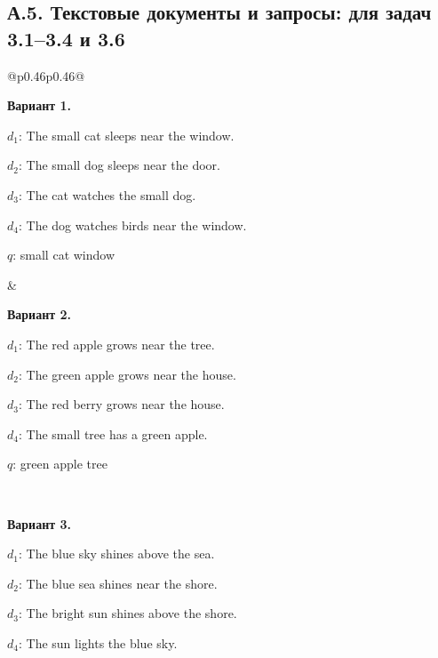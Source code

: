 \documentclass[12pt,a4paper]{article}
\begin{document}
\par\ifdim\dimexpr\pagegoal-\pagetotal\relax<140pt\relax\newpage\fi
\subsection*{А.5. Текстовые документы и запросы: для задач 3.1--3.4 и 3.6}
{\small
\begin{longtable}{@{}p{0.46\textwidth}p{0.46\textwidth}@{}}
\begin{minipage}[t]{\linewidth}\vspace{0pt}\raggedright\setlength{\parskip}{0pt}
\textbf{Вариант 1.}\par\smallskip
$d_1$: The small cat sleeps near the window.\par\smallskip
$d_2$: The small dog sleeps near the door.\par\smallskip
$d_3$: The cat watches the small dog.\par\smallskip
$d_4$: The dog watches birds near the window.\par\smallskip
$q$: small cat window\par
\end{minipage} &
\begin{minipage}[t]{\linewidth}\vspace{0pt}\raggedright\setlength{\parskip}{0pt}
\textbf{Вариант 2.}\par\smallskip
$d_1$: The red apple grows near the tree.\par\smallskip
$d_2$: The green apple grows near the house.\par\smallskip
$d_3$: The red berry grows near the house.\par\smallskip
$d_4$: The small tree has a green apple.\par\smallskip
$q$: green apple tree\par
\end{minipage}\\\noalign{\vskip 14pt}
\begin{minipage}[t]{\linewidth}\vspace{0pt}\raggedright\setlength{\parskip}{0pt}
\textbf{Вариант 3.}\par\smallskip
$d_1$: The blue sky shines above the sea.\par\smallskip
$d_2$: The blue sea shines near the shore.\par\smallskip
$d_3$: The bright sun shines above the shore.\par\smallskip
$d_4$: The sun lights the blue sky.\par\smallskip

\end{minipage}
\end{longtable}}
\end{document}
